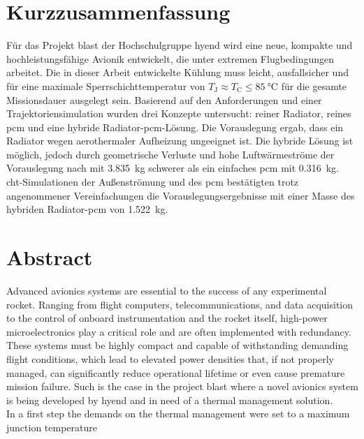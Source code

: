 \chapter*{Kurzzusammenfassung} %
\label{chap:Kurzzusammenfassung}


Für das Projekt \ac{blast} der Hochschulgruppe \ac{hyend} wird eine neue, kompakte und hochleistungsfähige Avionik entwickelt,
die unter extremen Flugbedingungen arbeitet. Die in dieser Arbeit entwickelte Kühlung muss leicht, ausfallsicher und für eine
maximale Sperrschichttemperatur von $T_\mathrm{J} \approx T_\mathrm{C} \leq \SI{85}{\celsius}$ für die gesamte Missionsdauer ausgelegt sein.
Basierend auf den Anforderungen und einer Trajektoriensimulation
wurden drei Konzepte untersucht: reiner Radiator, reines \ac{pcm} und eine hybride Radiator-\ac{pcm}-Lösung. Die Vorauslegung
ergab, dass ein Radiator wegen aerothermaler Aufheizung ungeeignet ist. Die hybride Lösung ist möglich, jedoch durch geometrische
Verluste und hohe Luftwärmeströme der Vorauslegung nach mit \SI{3.835}{\kilogram} schwerer als ein einfaches \ac{pcm}
mit \SI{0.316}{\kilogram}. \ac{cht}-Simulationen der Außenströmung und des \ac{pcm}
bestätigten trotz angenommener Vereinfachungen die Vorauslegungsergebnisse mit einer Masse des hybriden Radiator-\ac{pcm} von \SI{1.522}{\kilogram}.

\chapter*{Abstract} %
\label{chap:Abstract}
Advanced avionics systems are essential to the success of any experimental rocket.
Ranging from flight computers, telecommunications, and data acquisition to the control
of onboard instrumentation and the rocket itself, high-power microelectronics play a critical role and are often implemented with redundancy.
These systems must be highly compact and capable of withstanding demanding flight conditions, which lead to elevated
power densities that, if not properly managed, can significantly reduce operational lifetime or even cause premature mission failure.
Such is the case in the project \ac{blast} where a novel avionics system is being developed by \ac{hyend} and in need of a thermal management solution.\\

In a first step the demands on the thermal management were set to a maximum junction temperature